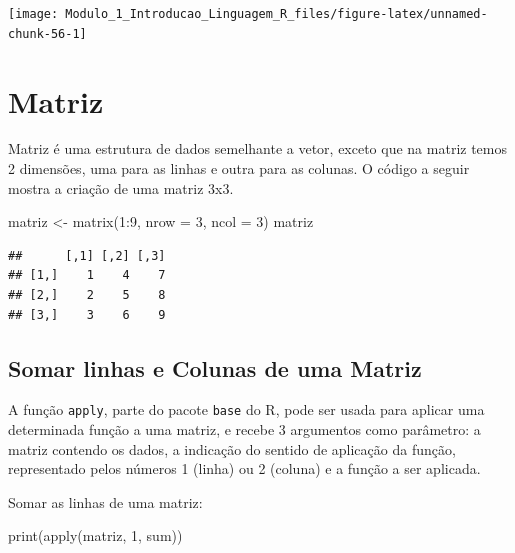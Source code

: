 \documentclass[
]{article}
\newenvironment{Shaded}{\begin{snugshade}}{\end{snugshade}}
\newcommand{\AttributeTok}[1]{\textcolor[rgb]{0.77,0.63,0.00}{#1}}
\newcommand{\DecValTok}[1]{\textcolor[rgb]{0.00,0.00,0.81}{#1}}
\newcommand{\FunctionTok}[1]{\textcolor[rgb]{0.00,0.00,0.00}{#1}}
\newcommand{\NormalTok}[1]{#1}
\newcommand{\OtherTok}[1]{\textcolor[rgb]{0.56,0.35,0.01}{#1}}
\newcommand{\SpecialCharTok}[1]{\textcolor[rgb]{0.00,0.00,0.00}{#1}}
\begin{document}
\begin{center}\texttt{[image: Modulo\_1\_Introducao\_Linguagem\_R\_files/figure-latex/unnamed-chunk-56-1]} \end{center}

\hypertarget{matriz}{%
\section{Matriz}\label{matriz}}

Matriz é uma estrutura de dados semelhante a vetor, exceto que na matriz
temos 2 dimensões, uma para as linhas e outra para as colunas. O código
a seguir mostra a criação de uma matriz 3x3.

\begin{Shaded}
\begin{Highlighting}[]
\NormalTok{matriz }\OtherTok{\textless{}{-}} \FunctionTok{matrix}\NormalTok{(}\DecValTok{1}\SpecialCharTok{:}\DecValTok{9}\NormalTok{, }\AttributeTok{nrow =} \DecValTok{3}\NormalTok{, }\AttributeTok{ncol =} \DecValTok{3}\NormalTok{)}
\NormalTok{matriz}
\end{Highlighting}
\end{Shaded}

\begin{verbatim}
##      [,1] [,2] [,3]
## [1,]    1    4    7
## [2,]    2    5    8
## [3,]    3    6    9
\end{verbatim}

\hypertarget{somar-linhas-e-colunas-de-uma-matriz}{%
\subsection{Somar linhas e Colunas de uma
Matriz}\label{somar-linhas-e-colunas-de-uma-matriz}}

A função \texttt{apply}, parte do pacote \texttt{base} do R, pode ser
usada para aplicar uma determinada função a uma matriz, e recebe 3
argumentos como parâmetro: a matriz contendo os dados, a indicação do
sentido de aplicação da função, representado pelos números 1 (linha) ou
2 (coluna) e a função a ser aplicada.

Somar as linhas de uma matriz:

\begin{Shaded}
\begin{Highlighting}[]
\FunctionTok{print}\NormalTok{(}\FunctionTok{apply}\NormalTok{(matriz, }\DecValTok{1}\NormalTok{, sum))}
\end{Highlighting}
\end{Shaded}
\end{document}

